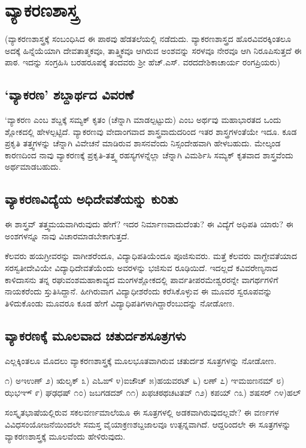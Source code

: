 \chapter{ವ್ಯಾಕರಣಶಾಸ್ತ್ರ}

(ವ್ಯಾಕರಣಶಾಸ್ತ್ರಕ್ಕೆ ಸಂಬಂಧಿಸಿದ ಈ ಪಾಠವು  ಹೆಡತಲೆಯಲ್ಲಿ ನಡೆದುದು. ವ್ಯಾಕರಣಶಾಸ್ತ್ರದ ಹೊರವಿವರಕ್ಕಿಂತಲೂ ಅದಕ್ಕೆ ಹಿನ್ನೆಯೆಯಾಗಿ ದೇವತಾತ್ಮಕವೂ, ತಾತ್ತ್ವಿಕವೂ ಆಗಿರುವ ಅಂಶವನ್ನು ಸರಳವೂ ನೇರವೂ ಆಗಿ ನಿರೂಪಿಸುತ್ತದೆ ಈ ಪಾಠ. ಇದನ್ನು ಸಂಗ್ರಹಿಸಿ ಬರಹರೂಪಕ್ಕೆ ತಂದವರು ಶ್ರೀ ಹೆಚ್.ಎಸ್. ವರದದೇಶಿಕಾಚಾರ್ಯ ರಂಗಪ್ರಿಯರು)

\section*{`ವ್ಯಾಕರಣ' ಶಬ್ದಾರ್ಥದ ವಿವರಣೆ}

`ವ್ಯಾಕರಣ ಎಂಬ ಶಬ್ದಕ್ಕೆ ಸಮ್ಯಕ್ ಕೃತಂ (ಚೆನ್ನಾಗಿ ಮಾಡಲ್ಪಟ್ಟುದು) ಎಂಬ ಅರ್ಥವು ಮಹಾಭಾರತದ ಒಂದು ಶ್ಲೋಕದಲ್ಲಿ ಹೇಳಲ್ಪಟ್ಟಿದೆ. ವ್ಯಾಕರಣವು  ವೇದಾಂಗವಾದ ಶಾಸ್ತ್ರವಾದುದರಿಂದ ಇತರ ಶಾಸ್ತ್ರಗಳಂತೆಯೇ ಇದೂ. ಕೂಡ ಪ್ರಕೃತಿ ತತ್ತ್ವಗಳನ್ನು ಚೆನ್ನಾಗಿ ವಿವೇಚನೆ ಮಾಡಿರುವ ಶಾಸನವೆಂದು ನಿಸ್ಸಂದೇಹವಾಗಿ ಹೇಳಬಹುದು. ಮೇಲ್ಕಂಡ ಕಾರಣದಿಂದ ನಾವು ವ್ಯಾಕರಣಕ್ಕೆ ಪ್ರಕೃತಿ-ತತ್ತ್ವ  ರಹಸ್ಯಗಳನ್ನೆಲ್ಲಾ ಚೆನ್ನಾಗಿ ವಿಮರ್ಶಿಸಿ ಸಮ್ಯಕ್ ಕೃತವಾದ ಶಾಸ್ತ್ರವೆಂದು ಅರ್ಥಮಾಡಬಹುದು.

\section*{ವ್ಯಾಕರಣವಿದ್ಯೆಯ ಅಧಿದೇವತೆಯನ್ನು ಕುರಿತು}

ಈ ಶಾಸ್ತ್ರವ್ ತತ್ತ್ವಮಯವಾಗಿರುವುದು ಹೇಗೆ? ಇದರ ನಿರ್ಮಾಣವಾದುದೆಂತು? ಈ ವಿದ್ಯೆಗೆ ಅಧಿಪತಿ  ಯಾರು? ಈ ಅಂಶಗಳನ್ನೂ ನಾವು ವಿಚಾರಮಾಡಬೇಕಾಗುತ್ತದೆ.

ಕೆಲವರು ಹಯಗ್ರೀವರನ್ನು ವಾಗೀಶರೆಂದೂ, ವಿದ್ಯಾಧಿಪತಿಯೆಂದೂ ಪೂಜಿಸುವರು. ಮತ್ತೆ ಕೆಲವರು ವಾಗ್ದೇವತೆಯಾದ ಸರಸ್ವತೀದೇವಿಯೇ ವಿದ್ಯಾಧಿದೇವತೆಯೆಂದು ಅವರಳನ್ನು ಭಜಿಸುವ ರೂಢಿಯಿದೆ. ಇದಲ್ಲದೆ ಕವಿವರೇಣ್ಯನಾದ ಕಾಳಿದಾಸನು ತನ್ನ ರಘುವಂಶಮಹಾಕಾವ್ಯದ ಮಂಗಳಶ್ಲೋಕದಲ್ಲಿ ಪಾರ್ವತೀಪರಮೇಶ್ವರರನ್ನೇ ವಾಗರ್ಥಗಳಿಗೆ ನಾಯಕರೆಂದು ಸ್ತುತಿಸಿದ್ದಾನೆ. ಹೀಗಿರುವಾಗ ವಿದ್ಯಾಧೀಶರೆಂದು ಕರೆಸಿಕೊಳ್ಳುವ ಈ ಮೂವರ ಸ್ವರೂಪವನ್ನು ತಿಳಿದುಕೊಂಡು ಮೂವರೂ ಕೂಡ ಹೇಗೆ ವಿದ್ಯಾಧಿಪತಿಗಳಾಗಿದ್ದಾರೆಂಬುದನ್ನು ನೋಡೋಣ.

\section*{ವ್ಯಾಕರಣಕ್ಕೆ ಮೂಲವಾದ ಚತುರ್ದಶಸೂತ್ರಗಳು}

ಎಲ್ಲಕ್ಕಿಂತಲೂ ಮೊದಲು ವ್ಯಾಕರಣಶಾಸ್ತ್ರಕ್ಕೆ  ಮೂಲಭೂತವಾಗಿರುವ ಚತುರ್ದಶ ಸೂತ್ರಗಳನ್ನು ನೋಡೋಣ.

೧) ಅಇಉಣ್  ೨) ಋಲೃಕ್ ೩) ಎಓಙ್ ೪)ಐಜೌಚ್ ೫)ಹಯವರಟ್ ೬) ಲಣ್  ೭) ಞಮಙಣನಮ್ ೮) ಝಭಞ್    ೯) ಘಢಧಷ್
 ೧೦) ಜಬಗಡದಶ್ ೧೧) ಖಫಚಠಥಚಟತವ್ ೧೨) ಕಪಯ್ ೧೩) ಶಷಸರ್ ೧೪)ಹಲ್
  
ಸಂಸ್ಕೃತಭಾಷೆಯಲ್ಲಿರುವ ಸಕಲವರ್ಣಮಾಲೆಯೂ ಈ ಸೂತ್ರಗಳಲ್ಲಿ ಅಡಕವಾಗಿರುವುದಲ್ಲವೇ? ಈ ವರ್ಣಗಳ ವಿವಿಧಸಂಯೋಜನೆಯಿಂದಲೇ ಸಮಸ್ತ ವೈಯಾಕ್ರಣಶಬ್ದಜಾಲವೂ ಉತ್ಪನ್ನವಾಗಿದೆ. ಆದ್ದರಿಂದಲೇ ಈ ಸೂತ್ರಗಳನ್ನು ವ್ಯಾಕರಣಶಾಸ್ತ್ರಕ್ಕೆ ಮೂಲವೆಂದು ಹೇಳಿರುವುದು.

